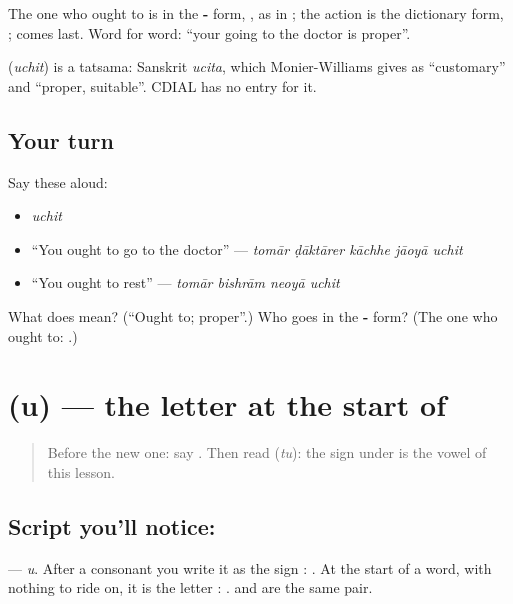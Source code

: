 The one who ought to is in the \textbf{-} form, \textbf{}, as in \textbf{  }; the action is the dictionary form, \textbf{}; \textbf{} comes last. Word for word: \textquotedblleft{}your going to the doctor is proper\textquotedblright{}.

\begin{cousinweb}
\textbf{} (\emph{uchit}) is a tatsama: Sanskrit \emph{ucita}, which Monier-Williams gives as \textquotedblleft{}customary\textquotedblright{} and \textquotedblleft{}proper, suitable\textquotedblright{}. CDIAL has no entry for it.
\end{cousinweb}

\subsection*{Your turn}
Say these aloud:

\begin{itemize}
\raggedright
  \item \emph{uchit}
  \item \textquotedblleft{}You ought to go to the doctor\textquotedblright{} — \emph{tomār ḍāktārer kāchhe jāoyā uchit}
  \item \textquotedblleft{}You ought to rest\textquotedblright{} — \emph{tomār bishrām neoyā uchit}
\end{itemize}

\begin{tcolorbox}[breakable,colback=teal!4,colframe=teal!35!black,title={Before you move on}]
What does \textbf{} mean? (\textquotedblleft{}Ought to; proper\textquotedblright{}.) Who goes in the \textbf{-} form? (The one who ought to: \textbf{}.)
\end{tcolorbox}
\section[\texorpdfstring{\bn{উ} (u)}{উ (u)}]{ (u) — the letter at the start of }

\label{lesson:BN-W269-letter-u}



\begin{quote}
Before the new one: say \textbf{}. Then read \textbf{} (\emph{tu}): the sign \textbf{} under \textbf{} is the vowel of this lesson.
\end{quote}

\subsection*{Script you'll notice: }
\textbf{} — \emph{u}. After a consonant you write it as the sign \textbf{}: \textbf{}. At the start of a word, with nothing to ride on, it is the letter \textbf{}: \textbf{}. \textbf{} and \textbf{} are the same pair.

